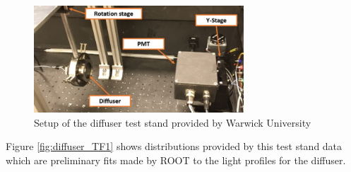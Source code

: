 \begin{figure}
    \centering
    \includegraphics[width=0.7\textwidth]{Figures/diffuser_test_stand.png}
    \caption{Setup of the diffuser test stand provided by Warwick University}
    \label{fig:diffuser_test_stand}
\end{figure}

Figure \ref{fig:diffuser_TF1} shows distributions provided by this test stand data which are preliminary fits made by ROOT to the light profiles for the diffuser. 

